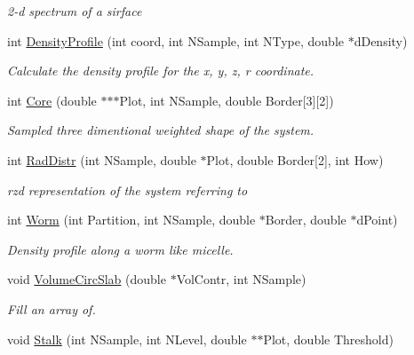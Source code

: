 \begin{DoxyCompactItemize}
\begin{DoxyCompactList}\small\item\em 2-\/d spectrum of a sirface \end{DoxyCompactList}\item 
int \hyperlink{classVarData_ad24bc84bc8f9fc3e311a9efd82f53e27}{\-Density\-Profile} (int coord, int \-N\-Sample, int \-N\-Type, double $\ast$d\-Density)
\begin{DoxyCompactList}\small\item\em \-Calculate the density profile for the x, y, z, r coordinate. \end{DoxyCompactList}\item 
\hypertarget{classVarData_a9b95694061cf3b61338ecb6db69954e9}{int \hyperlink{classVarData_a9b95694061cf3b61338ecb6db69954e9}{\-Core} (double $\ast$$\ast$$\ast$\-Plot, int \-N\-Sample, double \-Border\mbox{[}3\mbox{]}\mbox{[}2\mbox{]})}\label{classVarData_a9b95694061cf3b61338ecb6db69954e9}

\begin{DoxyCompactList}\small\item\em \-Sampled three dimentional weighted shape of the system. \end{DoxyCompactList}\item 
int \hyperlink{classVarData_a4d034e14a193c9943528897b0356ef42}{\-Rad\-Distr} (int \-N\-Sample, double $\ast$\-Plot, double \-Border\mbox{[}2\mbox{]}, int \-How)
\begin{DoxyCompactList}\small\item\em rzd representation of the system referring to \end{DoxyCompactList}\item 
\hypertarget{classVarData_a2b2420aa629ade75008ceb52b10cf045}{int \hyperlink{classVarData_a2b2420aa629ade75008ceb52b10cf045}{\-Worm} (int \-Partition, int \-N\-Sample, double $\ast$\-Border, double $\ast$d\-Point)}\label{classVarData_a2b2420aa629ade75008ceb52b10cf045}

\begin{DoxyCompactList}\small\item\em \-Density profile along a worm like micelle. \end{DoxyCompactList}\item 
void \hyperlink{classVarData_acb9df687ca0683b99bdb00425e9da912}{\-Volume\-Circ\-Slab} (double $\ast$\-Vol\-Contr, int \-N\-Sample)
\begin{DoxyCompactList}\small\item\em \-Fill an array of. \end{DoxyCompactList}\item 
\hypertarget{classVarData_a7521c027e75a7b726b1afb9f800301f6}{void \hyperlink{classVarData_a7521c027e75a7b726b1afb9f800301f6}{\-Stalk} (int \-N\-Sample, int \-N\-Level, double $\ast$$\ast$\-Plot, double \-Threshold)}\label{classVarData_a7521c027e75a7b726b1afb9f800301f6}


\end{DoxyCompactItemize}
